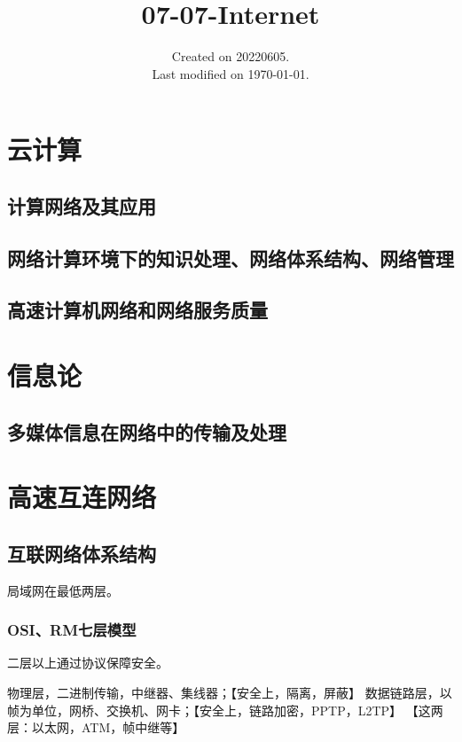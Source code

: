 \documentclass[UTF8]{../computerUniverse}
\begin{document}
\title{07-07-Internet}
\date{Created on 20220605.\\   Last modified on \today.}
\maketitle
\tableofcontents





\chapter{云计算}
\section{计算网络及其应用}
\section{网络计算环境下的知识处理、网络体系结构、网络管理}
\section{高速计算机网络和网络服务质量}



\chapter{信息论}
\section{多媒体信息在网络中的传输及处理}



\chapter{高速互连网络}
\section{互联网络体系结构}


局域网在最低两层。
\subsection{OSI、RM七层模型}
二层以上通过协议保障安全。

物理层，二进制传输，中继器、集线器；【安全上，隔离，屏蔽】
数据链路层，以帧为单位，网桥、交换机、网卡；【安全上，链路加密，PPTP，L2TP】
【这两层：以太网，ATM，帧中继等】
\end{document}
